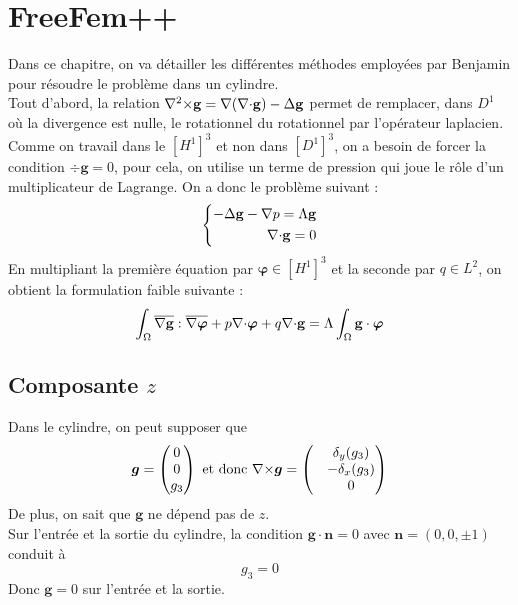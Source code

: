 \section{FreeFem++}
Dans ce chapitre, on va détailler les différentes méthodes employées par Benjamin pour résoudre le problème dans un cylindre.\\
Tout d'abord, la relation ${\nabla^2\times} \mathbf{g} = {\nabla}({\nabla\cdot} \mathbf{g}) - {\Delta} \mathbf{g}$ permet de remplacer, dans $D^1$ où la divergence est nulle, le rotationnel du rotationnel par l'opérateur laplacien.\\
Comme on travail dans le $[H^1]^3$ et non dans $[D^1]^3$, on a besoin de forcer la condition $\div\mathbf{g}=0$, pour cela, on utilise un terme de pression qui joue le rôle d'un multiplicateur de Lagrange. On a donc le problème suivant :
\begin{equation}
\left\{
\begin{aligned}
-{\Delta}\mathbf{g} - {\nabla} p = \Lambda \mathbf{g}\\
{\nabla\cdot} \mathbf{g}=0
\end{aligned}
\right.
\end{equation}
En multipliant la première équation par $\bm{\varphi}\in [H^1]^3$ et la seconde par $q\in L^2$, on obtient la formulation faible suivante :
\begin{equation*}
\int_\Omega \overline{{\nabla}\mathbf{g}}:\overline{{\nabla}\bm{\varphi}} + p{\nabla\cdot}\bm{\varphi} + q{\nabla\cdot}\mathbf{g} = \Lambda \int_\Omega \mathbf{g}\cdot\bm{\varphi}
\end{equation*}

\subsection{Composante $z$}
\label{freefem1d}
Dans le cylindre, on peut supposer que 
\[
\bm{g}=
\begin{pmatrix}
0\\
0\\
g_3
\end{pmatrix}
\text{ et donc }
{\nabla\times}\bm{g}=
\begin{pmatrix}
&\delta_y(g_3)\\
&-\delta_x(g_3)\\
&0
\end{pmatrix}
\]
De plus, on sait que $\bm{g}$ ne dépend pas de $z$.\\
Sur l'entrée et la sortie du cylindre, la condition $\bm{g}\cdot \bm{n}=0$ avec $\bm{n}=(0,0,\pm 1)$ conduit à \[g_3 = 0\]
Donc $\bm{g}=0$ sur l'entrée et la sortie.\\

